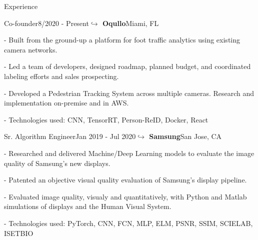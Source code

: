 \documentclass{resume} %
\begin{document}
% 



\vspace{-10pt}
\begin{rSection}{Experience}

\begin{rSubsection}{Co-founder}{8/2020 - Present}{\textbf{$\hookrightarrow$ Oqullo}}{Miami, FL}
\setlength{\itemindent}{.3in}
\item[-] Built from the ground-up a platform for foot traffic analytics using existing camera networks. 
\item[-] Led a team of developers, designed roadmap, planned budget, and coordinated labeling efforts and sales prospecting.
\item[-] Developed a Pedestrian Tracking System across multiple cameras. Research and implementation on-premise and in AWS.
\item[-] Technologies used: CNN, TensorRT, Person-ReID, Docker, React
\end{rSubsection}

\begin{rSubsection}{Sr. Algorithm Engineer}{Jan 2019 - Jul 2020}{\textbf{$\hookrightarrow$ Samsung}}{San Jose, CA}
\setlength{\itemindent}{.3in}
\item[-] Researched and delivered Machine/Deep Learning models to evaluate the image quality of Samsung's new displays.
\item[-] Patented an objective visual quality evaluation of Samsung's display pipeline.
\item[-] Evaluated image quality, visualy and quantitatively, with Python and Matlab simulations of displays and the Human Visual System.
\item[-] Technologies used: PyTorch, CNN, FCN, MLP, ELM, PSNR, SSIM, SCIELAB, ISETBIO
\end{rSubsection}



\end{rSection}
\end{document}
